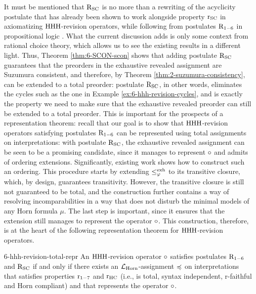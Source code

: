 It must be mentioned that $\mathrm{R}_{{\mathrm{SC}}}$ is no more than
a rewriting of the acyclicity postulate
that has already been shown to work 
alongside property $\mathrm{r}_{{\mathrm{SC}}}$ 
in axiomatizing ${\mathrm{HHH}}$-revision operators,
while following from postulates $\mathrm{R}_{1-6}$ in 
propositional logic 
\cite{DelgrandeP15,DelgrandePW18}.
What the current discussion adds is only some context from rational choice theory, 
which allows us to see the existing results in a different light.
Thus, Theorem \ref{thm:6-SCON-scon} shows that 
adding postulate $\mathrm{R}_{{\mathrm{SC}}}$ guarantees
that the preorders in the exhaustive revealed assignment are Suzumura consistent,
and therefore, by Theorem \ref{thm:2-suzumura-consistency}, 
can be extended to a total preorder: 
postulate $\mathrm{R}_{{\mathrm{SC}}}$, in other words, eliminates the cycles
such as the one in Example \ref{ex:6-hhh-revision-cycles},
and is exactly the property we need to make sure that 
the exhaustive revealed preorder can still be 
extended to a total preorder.
This is important for the prospects of a representation theorem:
recall that our goal is to show that ${\mathrm{HHH}}$-revision operators 
satisfying postulates $\mathrm{R}_{1-6}$
can be represented using total assignments on interpretations:
with postulate $\mathrm{R}_{{\mathrm{SC}}}$, the exhaustive revealed assignment
can be seen to be a promising candidate, 
since it manages to represent $\circ$ and admits of ordering extensions.
Significantly, existing work \cite{DelgrandeP15} 
shows how to construct such an ordering. 
This procedure starts by extending $\le^{{\operatorname{exh}}}_{\varphi}$ to its transitive closure, 
which, by design, guarantees transitivity.
However, the transitive closure is still not guaranteed to be total,
and the construction further contains a way of resolving 
incomparabilities in a way that does not disturb the minimal models of 
any Horn formula $\mu$. The last step is important, 
since it ensures that the extension still manages to represent
the operator $\circ$.
This construction, therefore, is at the heart of the following representation 
theorem for ${\mathrm{HHH}}$-revision operators.

\begin{thm}{\cite{DelgrandeP15}}{6-hhh-revision-total-repr}
	An ${\mathrm{HHH}}$-revision operator $\circ$ satisfies postulates $\mathrm{R}_{1-6}$ and $\mathrm{R}_{{\mathrm{SC}}}$
	if and only if there exists
	an $\mathcal{L}_{\mathrm{Horn}}$-assignment $\preccurlyeq$ on interpretations
	that satisfies properties $\mathrm{r}_{1-7}$ and $\mathrm{r}_{\mathrm{HC}}$
	(i.e., is total, syntax independent, r-faithful and Horn compliant)
	and that represents the operator $\circ$.
\end{thm}

